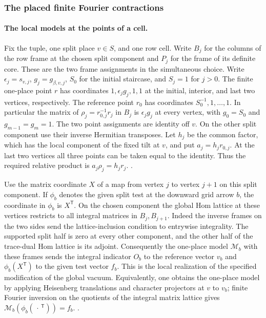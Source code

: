 \subsubsection{The placed finite Fourier contractions}
\paragraph{The local models at the points of a cell.}
Fix the tuple, one split place \(v\in S\), and one row cell.
Write \(B_j\) for the columns of the row frame at the chosen split
component and \(P_j\) for the frame of its definite core. These are
the two frame assignments in the simultaneous choice. Write
\(\epsilon_j=s_{v,j}\), \(g_j=g_{\beta,v,j}\), \(S_0\) for the initial
staircase, and \(S_j=1\) for \(j>0\). The finite one-place point \(r\)
has coordinates \(1,\epsilon_jg_j,1,1\) at the initial, interior, and
last two vertices, respectively. The reference point \(r_0\) has
coordinates \(S_0^{-1},1,\dots,1\). In particular the matrix of
\(\rho_j=r_{0,j}^{-1}r_j\) in \(B_j\) is \(\epsilon_jg_j\) at
every vertex, with \(g_0=S_0\) and \(g_{m-1}=g_m=1\).
The two point assignments are identity off \(v\). On the other split
component use their inverse Hermitian transposes. Let \(h_j\)
be the common factor, which has the local component of the fixed
tilt at \(v\), and put \(a_j=h_jr_{0,j}\). At the last two vertices
all three points can be taken equal to the identity. Thus the
required relative product is \(a_j\rho_j=h_jr_j\).
.

Use the matrix coordinate \(X\) of a map from vertex \(j\) to
vertex \(j+1\) on this split component. If \(\phi_b\) denotes the
given split test at the downward grid arrow \(b\), the coordinate
in \(\phi_b\) is \(X^{\mathsf T}\). On the chosen component the
global Hom lattice at these vertices restricts to all integral
matrices in \(B_j,B_{j+1}\). Indeed the inverse frames on the two
sides send the lattice-inclusion condition to entrywise
integrality. The supported split half is zero at every other
component, and the other half of the trace-dual Hom lattice is its
adjoint. Consequently the one-place model \(\mathcal M_b\) with
these frames sends the integral indicator \(O_b\) to the reference
vector \(v_b\) and \(\phi_b(X^{\mathsf T})\) to the given test
vector \(f_b\). This is the local realization of the specified
modification of the global vacuum. Equivalently, one obtains the
one-place model by applying Heisenberg translations and character
projectors at \(v\) to \(v_b\); finite Fourier inversion on the
quotients of the integral matrix lattice gives
\(\mathcal M_b(\phi_b(\,\cdot\,^{\mathsf T}))=f_b\).
.

